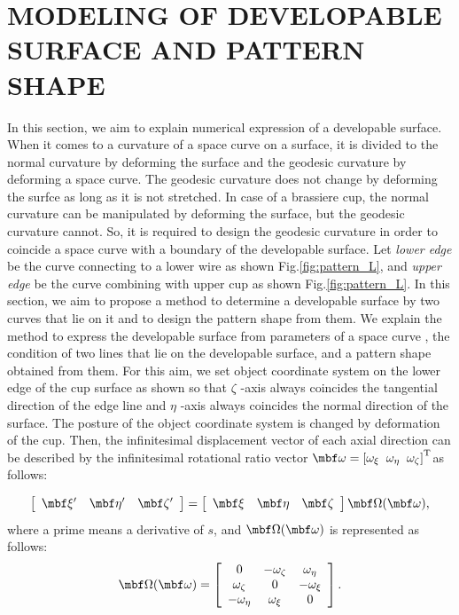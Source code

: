 \documentclass[E]{scitrans}
\begin{document}
\section*{MODELING OF DEVELOPABLE SURFACE AND PATTERN SHAPE}

In this section, we aim to explain numerical expression of a developable surface. 
When it comes to a curvature of a space curve on a surface, it is divided to the normal curvature by deforming the surface and the geodesic curvature by deforming a space curve. The geodesic curvature does not change by deforming the surfce as long as it is not stretched. In case of a brassiere cup, the normal curvature can be manipulated by deforming the surface, but the geodesic curvature cannot. So, it is required to design the geodesic curvature in order to coincide a space curve with a boundary of the developable surface. Let \textit{lower edge} be the curve connecting to a lower wire as shown Fig.\ref{fig:pattern_L}, and \textit{upper edge} be the curve combining with upper cup as shown Fig.\ref{fig:pattern_L}. In this section, we aim to propose a method to determine a developable surface by two curves that lie on it and to design the pattern shape from them. We explain the method to express the developable surface from parameters of a space curve , the condition of two lines that lie on the developable surface, and a pattern shape obtained from them.
For this aim, we set object coordinate system on the lower edge of the cup surface as shown  so that $\zeta$ -axis always coincides the tangential direction of the edge line and $\eta$ -axis always coincides the normal direction of the surface. The posture of the object coordinate system is changed by deformation of the cup. Then, the infinitesimal displacement vector of each axial direction can be described by the infinitesimal rotational ratio vector $ \mbold{\omega} = \left[\omega_{\xi}\;\;\omega_{\eta}\;\;\omega_{\zeta}\right]^{\mathrm{T}}$as follows:

\begin{equation}\label{eq:ObjSys}
\left[\begin{array}{ccc} \xivec' & \etavec' & \zetavec' \end{array}\right] = \left[\begin{array}{ccc} \xivec & \etavec & \zetavec \end{array} \right] \mbold{\Omega}(\mbold{\omega}), 
\end{equation}
where a prime means a derivative of $s$, and $\mbold{\Omega}(\mbold{\omega})$ is represented as follows: 
\begin{equation}
\mbold{\Omega}(\mbold{\omega}) = \left[\begin{array}{ccc}
0 &-\omega_{\zeta} & \omega_{\eta} \\
\omega_{\zeta} & 0 &-\omega_{\xi} \\
-\omega_{\eta} & \omega_{\xi} &0
\end{array}\right]. 
\end{equation}
\end{document}
